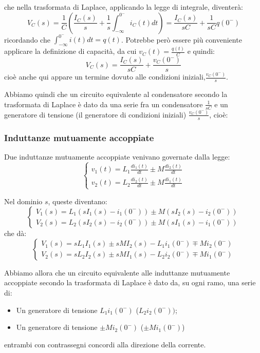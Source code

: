 \documentclass[a4paper,11pt]{article}
\begin{document}
che nella trasformata di Laplace, applicando la legge di integrale, diventerà:
$$
V_C(s) = \frac{1}{C} \left( \frac{I_C(s)}{s} + \frac{1}{s}\int_{-\infty}^{0^-}i_C(t)dt \right) = \frac{I_C(s)}{sC} + \frac{1}{sC} q(0^-)
$$
ricordando che $\int_{-\infty}^{0^-} i(t) dt = q(t)$.
Potrebbe però essere più conveniente applicare la definizione di capacità, da cui $v_C(t) = \frac{q(t)}{C}$ e quindi:
$$
V_C(s) = \frac{I_C(s)}{sC} + \frac{v_C(0^-)}{s}
$$
cioè anche qui appare un termine dovuto alle condizioni iniziali,$ \frac{v_C(0^-)}{s}$.

Abbiamo quindi che un circuito equivalente al condensatore secondo la trasformata di Laplace è dato da una serie fra un condensatore $\frac{1}{sC}$ e un generatore di tensione (il generatore di condizioni iniziali) $\frac{v_C(0^-)}{s}$, cioè:

\begin{center}
\end{center}

\subsubsection{Induttanze mutuamente accoppiate}
Due induttanze mutuamente accoppiate venivano governate dalla legge:
\[
	\begin{cases}			
		v_1(t) = L_1 \frac{d i_1(t)}{dt} \pm M \frac{d i_2(t)}{dt} \\
		v_2(t) = L_2 \frac{d i_2(t)}{dt} \pm M \frac{d i_1(t)}{dt}
	\end{cases}
\]

Nel dominio $s$, queste diventano:
\[
	\begin{cases}
		V_1(s) = L_1 \left( s I_1(s) - i_1(0^-) \right) \pm M \left( s I_2(s) - i_2(0^-) \right) \\
		V_2(s) = L_2 \left( s I_2(s) - i_2(0^-) \right) \pm M \left( s I_1(s) - i_1(0^-) \right)
	\end{cases}
\]
che dà:
\[
	\begin{cases}
		V_1(s) = s L_1 I_1(s) \pm s M I_2(s) - L_1 i_1(0^-) \mp M i_2(0^-) \\
		V_2(s) = s L_2 I_2(s) \pm s M I_1(s) - L_2 i_2(0^-) \mp M i_1(0^-)
	\end{cases}
\]

Abbiamo allora che un circuito equivalente alle induttanze mutuamente accoppiate secondo la trasformata di Laplace è dato da, su ogni ramo, una serie di:
\begin{itemize}
	\item Un generatore di tensione $L_1 i_1(0^-)$ ($L_2 i_2 (0^-))$;
	\item Un generatore di tensione $\pm M i_2(0^-)$ ($\pm M i_1(0^-)$)
\end{itemize}
entrambi con contrassegni concordi alla direzione della corrente.
\end{document}

